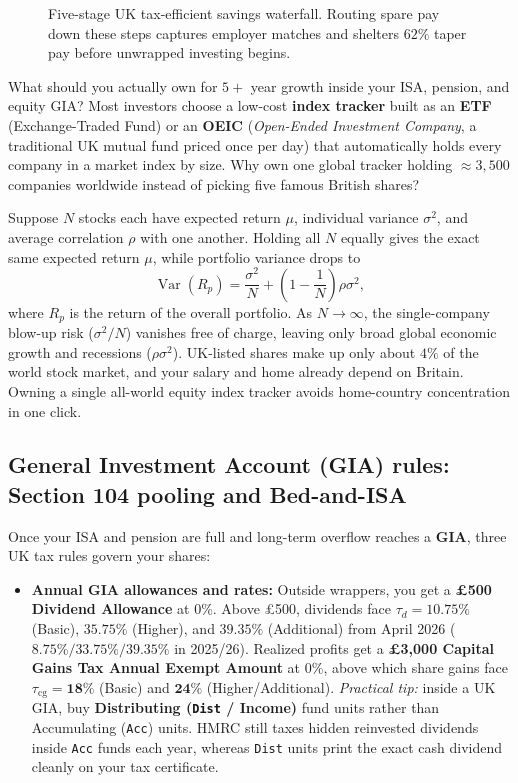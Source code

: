 \begin{figure}[htbp]
\caption{Five-stage UK tax-efficient savings waterfall. Routing spare pay down these steps captures employer matches and shelters $62\%$ taper pay before unwrapped investing begins.}
\label{ch11:fig-uk-waterfall}
\end{figure}

What should you actually own for $5+$ year growth inside your ISA, pension, and equity GIA? Most investors choose a low-cost \textbf{index tracker} built as an \textbf{ETF} (Exchange-Traded Fund) or an \textbf{OEIC} (\emph{Open-Ended Investment Company}, a traditional UK mutual fund priced once per day) that automatically holds every company in a market index by size. Why own one global tracker holding $\approx 3{,}500$ companies worldwide instead of picking five famous British shares?

Suppose $N$ stocks each have expected return $\mu$, individual variance $\sigma^2$, and average correlation $\rho$ with one another. Holding all $N$ equally gives the exact same expected return $\mu$, while portfolio variance drops to
\[
  \operatorname{Var}(R_p) = \frac{\sigma^2}{N} + \left(1 - \frac{1}{N}\right)\rho\sigma^2,
\]
where $R_p$ is the return of the overall portfolio. As $N \to \infty$, the single-company blow-up risk ($\sigma^2 / N$) vanishes free of charge, leaving only broad global economic growth and recessions ($\rho\sigma^2$). UK-listed shares make up only about \textbf{$4\%$} of the world stock market, and your salary and home already depend on Britain. Owning a single all-world equity index tracker avoids home-country concentration in one click.

\subsection{General Investment Account (GIA) rules: Section 104 pooling and Bed-and-ISA}

Once your ISA and pension are full and long-term overflow reaches a \textbf{GIA}, three UK tax rules govern your shares:
\begin{itemize}
  \item \textbf{Annual GIA allowances and rates:} Outside wrappers, you get a \textbf{\pounds 500 Dividend Allowance} at $0\%$. Above \pounds 500, dividends face $\tau_d = 10.75\%$ (Basic), $35.75\%$ (Higher), and $39.35\%$ (Additional) from April 2026 ($8.75\% / 33.75\% / 39.35\%$ in 2025/26). Realized profits get a \textbf{\pounds 3,000 Capital Gains Tax Annual Exempt Amount} at $0\%$, above which share gains face $\tau_{\text{cg}} = \mathbf{18\%}$ (Basic) and \textbf{$\mathbf{24\%}$} (Higher/Additional). \emph{Practical tip:} inside a UK GIA, buy \textbf{Distributing (\texttt{Dist} / Income)} fund units rather than Accumulating (\texttt{Acc}) units. HMRC still taxes hidden reinvested dividends inside \texttt{Acc} funds each year, whereas \texttt{Dist} units print the exact cash dividend cleanly on your tax certificate.
\end{itemize}

